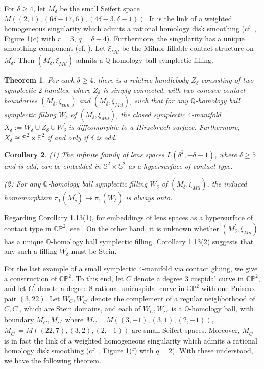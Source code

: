 \documentclass[11pt]{amsart}
\theoremstyle{plain}
\newtheorem{theorem}{Theorem}
\numberwithin{theorem}{section}
\newtheorem{corollary}[theorem]{Corollary}
\theoremstyle{definition}
\newcommand{\C}{{\mathbb C}}
\newcommand{\Q}{{\mathbb Q}}
\renewcommand{\P}{{\mathbb P}}
\newcommand{\s}{{\mathbb S}}
\begin{document}
For $\delta\geq 4$, let $M_\delta^\prime$ be the small Seifert space 
$M((2,1),(6\delta-17,6),(4\delta-3,\delta-1))$. It is the link of a weighted homogeneous singularity 
which admits a rational homology disk smoothing (cf. \cite{BS}, Figure 1(c) with $r=3$, 
$q=\delta-4$). Furthermore, the singularity has a unique smoothing component 
(cf. \cite{W}). Let $\xi_{Mil}$ be the Milnor fillable contact structure on $M_\delta^\prime$. Then 
$(M_\delta^\prime,\xi_{Mil})$ admits a $\Q$-homology ball symplectic filling. 

\begin{theorem}
For each $\delta\geq 4$, there is a relative handlebody $Z_\delta$ consisting of two symplectic $2$-handles, where $Z_\delta$ is simply connected, with two concave contact boundaries 
$(M_\delta,\xi_{can})$ and $(M_\delta^\prime,\xi_{Mil})$, such that for any $\Q$-homology ball symplectic filling $W_\delta^\prime$ of $(M_\delta^\prime,\xi_{Mil})$, the closed symplectic 
$4$-manifold $X_\delta:=W_\delta\cup Z_\delta\cup W_\delta^\prime$ is diffeomorphic to a Hirzebruch
surface. Furthermore, $X_\delta\cong \s^2\times \s^2$ if and only if $\delta$ is odd. 
\end{theorem}

\begin{corollary}
{\em(1)} The infinite family of lens spaces $L(\delta^2,-\delta-1)$, where $\delta\geq 5$ and is odd, 
can be embedded in $\s^2\times \s^2$ as a hypersurface of contact type. 

{\em(2)} For any $\Q$-homology ball symplectic filling $W_\delta^\prime$ of 
$(M_\delta^\prime,\xi_{Mil})$, the induced homomorphism $\pi_1(M_\delta^\prime)\rightarrow \pi_1(W_\delta^\prime)$ is always onto. 
\end{corollary}

Regarding Corollary 1.13(1), for embeddings of lens spaces as a hypersurface of contact type
in $\C\P^2$,  see \cite{V, EvS, EMPR}. On the other hand, it is unknown whether 
$(M_\delta^\prime,\xi_{Mil})$ has a unique $\Q$-homology ball symplectic filling. Corollary 1.13(2) suggests that any such a filling $W_\delta^\prime$ must be Stein. 

\vspace{2mm}

For the last example  of a small symplectic $4$-manifold via contact gluing, we give 
a construction of $\C\P^2$. To this end, let $C$ denote a degree $3$ cuspidal curve in $\C\P^2$,
and let $C^\prime$ denote a degree $8$ rational unicuspidal curve in $\C\P^2$ with one Puiseux pair 
$(3,22)$. Let $W_C,W_{C^\prime}$ denote the complement of a regular neighborhood of
$C,C^\prime$, which are Stein domains, and each of $W_C,W_{C^\prime}$ is a $\Q$-homology ball, with boundary $M_C,M_{C^\prime}$ where $M_C=M((3,-1),(3,1),(2,-1))$, 
$M_{C^\prime}=M((22,7),(3,2),(2,-1))$ are small Seifert spaces. Moreover, $M_{C^\prime}$ is in fact the link of a weighted homogeneous singularity which admits a rational homology disk smoothing 
(cf. \cite{BS}, Figure 1(f) with $q = 2$). With these understood, we have the following theorem.
\end{document}
